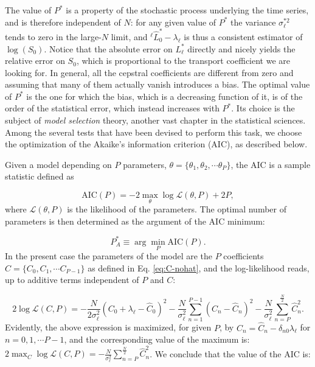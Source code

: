 The value of $P^{*}$ is a property of the stochastic process underlying the time series, and is therefore independent of $N$: for any given value of $P^{*}$ the variance $\sigma_{\ell}^{*2}$ tends to zero in the large-$N$ limit, and $^\ell\hat{L}^*_0-\lambda_{\ell}$ is thus a consistent estimator of $\log(S_{0})$. Notice that the absolute error on $L^*_{\ell}$ directly and nicely yields the relative error on $S_{0}$, which is proportional to the transport coefficient we are looking for. In general, all the cepstral coefficients are different from zero and assuming that many of them actually vanish introduces a bias. The optimal value of $P^{*}$ is the one for which the bias, which is a decreasing function of it, is of the order of the statistical error, which instead increases with $P^*$. Its choice is the subject of \emph{model selection} theory, another vast chapter in the statistical sciences.\cite{Claeskens2008} Among the several tests that have been devised to perform this task, we choose the optimization of the Akaike's information criterion (AIC),\cite{Claeskens2008,H.Akaike1974} as described below.

Given a model depending on $P$ parameters, $\theta = \{\theta_{1}, \theta_{2}, \cdots \theta_{P}\}$, the AIC is a sample statistic defined as

\begin{equation}
\mathrm{AIC}(P) =-2\max_{\theta}\log\mathcal{L}(\theta,P)+2P,\label{eq:AIC}
\end{equation}
where $\mathcal{L}(\theta,P)$ is the likelihood of the parameters. The optimal number of parameters is then determined as the argument of the AIC minimum:

\begin{equation}
P_A^* \equiv \arg\min_P\mathrm{AIC}(P) . \label{eq:P*}
\end{equation}
In the present case the parameters of the model are the $P$ coefficients $C=\{C_{0},C_{1},\cdots C_{P-1}\}$ as defined in Eq. \eqref{eq:C-nohat}, and the log-likelihood reads, up to additive terms independent of $P$ and $C$:

\begin{equation}
2\log\mathcal{L}(C,P) = -\frac{N}{2\sigma_\ell^{2}}\left(C_{0}+\lambda_{\ell}-\hat{C}_{0}\right)^{2}
 -\frac{N}{\sigma_\ell^{2}}\sum_{n=1}^{P-1}\left(C_{n}-\hat{C}_{n}\right)^{2} -\frac{N}{\sigma_\ell^{2}}\sum_{n=P}^\frac{N}{2} \hat{C}_{n}^{2}.
\end{equation}
Evidently, the above expression is maximized, for given $P$, by $C_{n}=\hat{C}_{n}-\delta_{n0}\lambda_{\ell}$ for $n=0,1,\cdots P-1$, and the corresponding value of the maximum is: $2\max_C\log\mathcal{L}(C,P)=-\frac{N}{\sigma_\ell^{2}}\sum_{n=P}^\frac{N}{2} \hat{C}_{n}^{2}$.
We conclude that the value of the AIC is:

